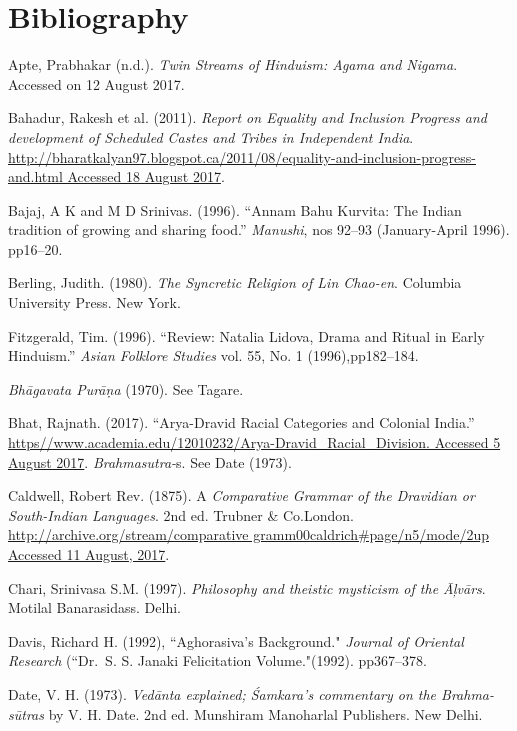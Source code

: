 \section*{Bibliography}

\begin{thebibliography}{99}
 Apte, Prabhakar (n.d.). \textit{Twin Streams of Hinduism: Agama and Nigama}. Accessed on 12 August 2017.

  Bahadur, Rakesh et al. (2011). \textit{Report on Equality and Inclusion Progress and development of Scheduled Castes and Tribes in Independent India}. \url{http://bharatkalyan97.blogspot.ca/2011/08/equality-and-inclusion-progress-and.html Accessed 18 August 2017}.

  Bajaj, A K and M D Srinivas. (1996). “Annam Bahu Kurvita: The Indian tradition of growing and sharing food.” \textit{Manushi}, nos 92–93 (January-April 1996). pp16–20.

  Berling, Judith. (1980). \textit{The Syncretic Religion of Lin Chao-en}. Columbia University Press. New York.

  Fitzgerald, Tim. (1996). “Review: Natalia Lidova, Drama and Ritual in Early Hinduism.” \textit{Asian Folklore Studies} vol. 55, No. 1 (1996),\break pp182–184.

  \textit{Bhāgavata Purāṇa} (1970). See Tagare.

  Bhat, Rajnath. (2017). “Arya-Dravid Racial Categories and Colonial India.” \url{https//www.academia.edu/12010232/Arya-Dravid_Racial_Division. Accessed 5 August 2017}. \textit{Brahmasutra-}s. See Date (1973).

  Caldwell, Robert Rev. (1875). A \textit{Comparative Grammar of the Dravidian or South-Indian Languages}. 2nd ed. Trubner \& Co.London. \url{http://archive.org/stream/comparative gramm00caldrich#page/n5/mode/2up Accessed 11 August, 2017}.

  Chari, Srinivasa S.M. (1997). \textit{Philosophy and theistic mysticism of the Āļvārs}. Motilal Banarasidass. Delhi.

  Davis, Richard H. (1992), “Aghorasiva's Background." \textit{Journal of Oriental Research} (“Dr.\ S. S. Janaki Felicitation Volume."(1992). pp367–378.

  Date, V. H. (1973). \textit{Vedānta explained; Śamkara’s commentary on the Brahma-sūtras} by V. H. Date. 2nd ed. Munshiram Manoharlal Publishers. New Delhi.


\end{thebibliography}
